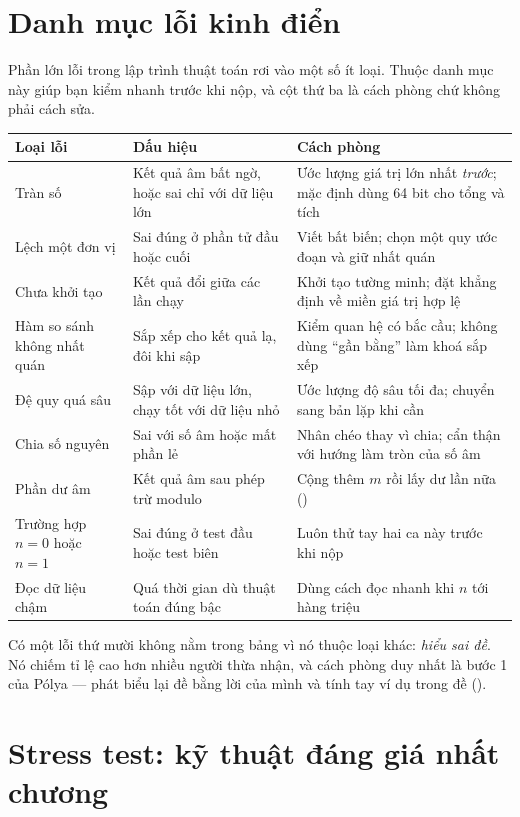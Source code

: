 \documentclass[../../algorithm.tex]{subfiles}
\begin{document}
\section{Danh mục lỗi kinh điển}

Phần lớn lỗi trong lập trình thuật toán rơi vào một số ít loại. Thuộc danh mục này giúp bạn kiểm nhanh trước khi nộp, và cột thứ ba là cách phòng chứ không phải cách sửa.

\begin{center}\footnotesize
\begin{tabularx}{\linewidth}{@{}L{3.4cm}L{4.4cm}Y@{}}
\toprule
\textbf{Loại lỗi} & \textbf{Dấu hiệu} & \textbf{Cách phòng}\\
\midrule
Tràn số & Kết quả âm bất ngờ, hoặc sai chỉ với dữ liệu lớn & Ước lượng giá trị lớn nhất \emph{trước}; mặc định dùng 64 bit cho tổng và tích\\
Lệch một đơn vị & Sai đúng ở phần tử đầu hoặc cuối & Viết bất biến; chọn một quy ước đoạn và giữ nhất quán\\
Chưa khởi tạo & Kết quả đổi giữa các lần chạy & Khởi tạo tường minh; đặt khẳng định về miền giá trị hợp lệ\\
Hàm so sánh không nhất quán & Sắp xếp cho kết quả lạ, đôi khi sập & Kiểm quan hệ có bắc cầu; không dùng ``gần bằng'' làm khoá sắp xếp\\
Đệ quy quá sâu & Sập với dữ liệu lớn, chạy tốt với dữ liệu nhỏ & Ước lượng độ sâu tối đa; chuyển sang bản lặp khi cần\\
Chia số nguyên & Sai với số âm hoặc mất phần lẻ & Nhân chéo thay vì chia; cẩn thận với hướng làm tròn của số âm\\
Phần dư âm & Kết quả âm sau phép trừ modulo & Cộng thêm \(m\) rồi lấy dư lần nữa ()\\
Trường hợp \(n=0\) hoặc \(n=1\) & Sai đúng ở test đầu hoặc test biên & Luôn thử tay hai ca này trước khi nộp\\
Đọc dữ liệu chậm & Quá thời gian dù thuật toán đúng bậc & Dùng cách đọc nhanh khi \(n\) tới hàng triệu\\
\bottomrule
\end{tabularx}
\end{center}

Có một lỗi thứ mười không nằm trong bảng vì nó thuộc loại khác: \emph{hiểu sai đề}. Nó chiếm tỉ lệ cao hơn nhiều người thừa nhận, và cách phòng duy nhất là bước 1 của Pólya --- phát biểu lại đề bằng lời của mình và tính tay ví dụ trong đề ().

\section{Stress test: kỹ thuật đáng giá nhất chương}
\end{document}
